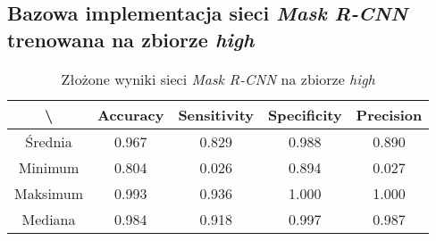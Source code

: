 \subsection{Bazowa implementacja sieci \textit{Mask R-CNN} trenowana na zbiorze \textit{high}}

\begin{table}[H]
	\centering
	\caption{Złożone wyniki sieci \textit{Mask R-CNN} na zbiorze \textit{high}}
	\vspace{6pt}
	{\footnotesize
		\begin{tabular}{|c|c|c|c|c|}
      \hline \textbackslash & Accuracy & Sensitivity & Specificity & Precision \\
      \hline Średnia & 0.967 & 0.829 & 0.988 & 0.890 \\
      \hline Minimum & 0.804 & 0.026 & 0.894 & 0.027 \\
      \hline Maksimum & 0.993 & 0.936 & 1.000 & 1.000 \\
      \hline Mediana & 0.984 & 0.918 & 0.997 & 0.987 \\
      \hline
		\end{tabular}
	}
  \vspace{0pt}
  \label{Tab:high_original_calculated}
\end{table}




